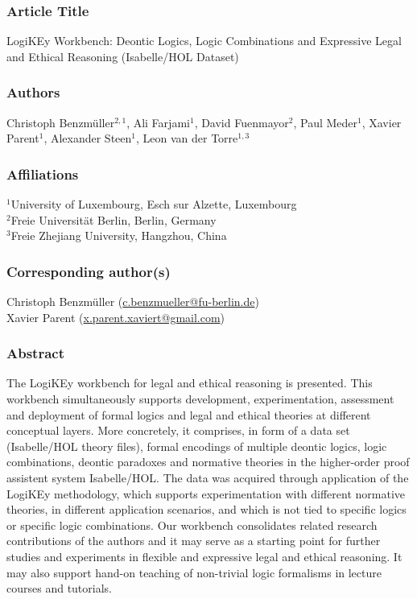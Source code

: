 \documentclass{article}
\newcommand{\comment}[1]{
}
\begin{document}
\subsubsection*{Article Title}
LogiKEy Workbench: Deontic Logics, Logic Combinations and Expressive Legal and Ethical Reasoning (Isabelle/HOL Dataset)

\subsubsection*{Authors}
Christoph Benzmüller$^{2,1}$, Ali Farjami$^{1}$, David Fuenmayor$^{2}$, Paul Meder$^{1}$, Xavier Parent$^{1}$, Alexander Steen$^{1}$, Leon van der Torre$^{1,3}$

\subsubsection*{Affiliations}
$^{1}$University of Luxembourg, Esch sur Alzette, Luxembourg\\
$^{2}$Freie Universität Berlin, Berlin, Germany \\
$^{3}$Freie Zhejiang University, Hangzhou, China

\subsubsection*{Corresponding author(s)}
Christoph Benzmüller (\url{c.benzmueller@fu-berlin.de}) \\
Xavier Parent (\url{x.parent.xaviert@gmail.com}) 

\comment{
[Firstname Lastname (email@address) – institutional email address preferred]
}


\subsubsection*{Abstract}
The LogiKEy workbench for 
legal and ethical reasoning is presented. This workbench
simultaneously supports development, experimentation, assessment and
deployment of formal logics and legal and ethical theories at
different conceptual layers. 
More concretely, it comprises, in form of a data set (Isabelle/HOL theory
files), formal encodings of multiple deontic logics, logic
combinations, deontic paradoxes and normative theories in the
higher-order proof assistent system Isabelle/HOL.  The data was
acquired through application of the LogiKEy methodology, which
supports experimentation with different normative theories, in
different application scenarios, and which is not tied to specific
logics or specific logic combinations.  Our workbench consolidates
related research contributions of the authors and it may serve as a
starting point for further studies and experiments in flexible and
expressive legal and ethical reasoning. It may also support hand-on
teaching of non-trivial logic formalisms in lecture courses and
tutorials.
\end{document}
